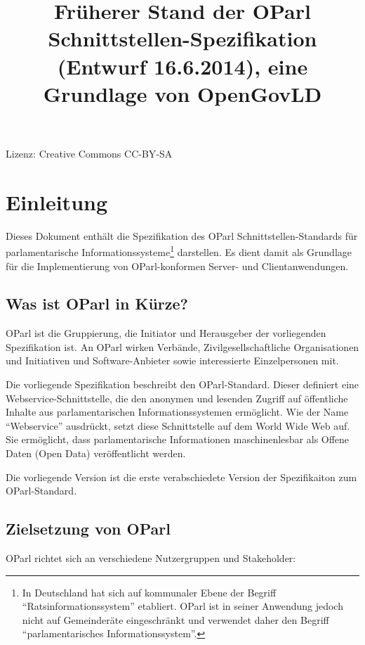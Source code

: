 \documentclass[,a4paper]{article}
\title{Früherer Stand der OParl Schnittstellen-Spezifikation (Entwurf
16.6.2014), eine Grundlage von OpenGovLD}
\author{}
\date{}
\begin{document}
\maketitle

Lizenz: Creative Commons CC-BY-SA

\section{Einleitung}\label{einleitung}

Dieses Dokument enthält die Spezifikation des OParl
Schnittstellen-Standards für parlamentarische
Informationssysteme\footnote{In Deutschland hat sich auf kommunaler
  Ebene der Begriff ``Ratsinformationssystem'' etabliert. OParl ist in
  seiner Anwendung jedoch nicht auf Gemeinderäte eingeschränkt und
  verwendet daher den Begriff ``parlamentarisches Informationssystem''.}
darstellen. Es dient damit als Grundlage für die Implementierung von
OParl-konformen Server- und Clientanwendungen.

\subsection{Was ist OParl in Kürze?}\label{was-ist-oparl-in-kuxfcrze}

OParl ist die Gruppierung, die Initiator und Herausgeber der
vorliegenden Spezifikation ist. An OParl wirken Verbände,
Zivilgesellschaftliche Organisationen und Initiativen und
Software-Anbieter sowie interessierte Einzelpersonen mit.

Die vorliegende Spezifikation beschreibt den OParl-Standard. Dieser
definiert eine Webservice-Schnittstelle, die den anonymen und lesenden
Zugriff auf öffentliche Inhalte aus parlamentarischen
Informationssystemen ermöglicht. Wie der Name ``Webservice'' ausdrückt,
setzt diese Schnittstelle auf dem World Wide Web auf. Sie ermöglicht,
dass parlamentarische Informationen maschinenlesbar als Offene Daten
(Open Data) veröffentlicht werden.

Die vorliegende Version ist die erste verabschiedete Version der
Spezifikaiton zum OParl-Standard.

\subsection{Zielsetzung von OParl}\label{zielsetzung-von-oparl}

OParl richtet sich an verschiedene Nutzergruppen und Stakeholder:
\end{document}
